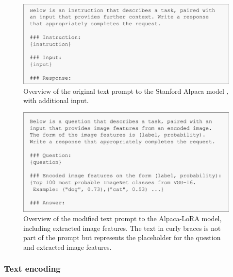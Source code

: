         \begin{figure}[htb]
            \centerline{
            \includegraphics[width=\textwidth]{images/alpaca_prompt_format.png}}
            \caption[Overview of the original text prompt to the Stanford Alpaca model, with additional input.]{Overview of the original text prompt to the Stanford Alpaca model \cite{taoriStanfordCRFM, taoriStanfordAlpacaInstructionfollowing2023}, with additional input.}
            \label{fig:alpaca_prompt_format}
        \end{figure}

        \begin{figure}[htb]
            \centerline{
            \includegraphics[width=\textwidth]{images/alpaca_modified_prompt_format.png}}
            \caption{Overview of the modified text prompt to the Alpaca-LoRA model, including extracted image features. The text in curly braces is not part of the prompt but represents the placeholder for the question and extracted image features.}
            \label{fig:alpaca_modified_prompt_format}
        \end{figure}



        

        \subsubsection{Text encoding}

